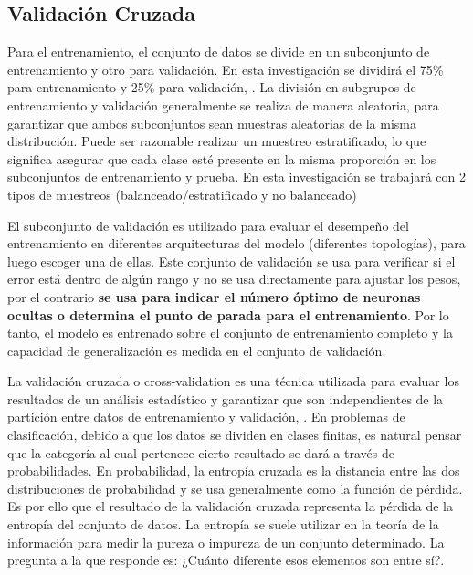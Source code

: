 	\subsection{Validación Cruzada}
	

		Para el entrenamiento, el conjunto de datos se divide en un subconjunto de entrenamiento y otro para validación. En esta investigación se dividirá el 75\% para entrenamiento y 25\% para validación, {\citep {Elkan12evaluatingclassifiers}}. La división en subgrupos de entrenamiento y validación generalmente se realiza de manera aleatoria, para garantizar que ambos subconjuntos sean muestras aleatorias de la misma distribución. Puede ser razonable realizar un muestreo estratificado, lo que significa asegurar que cada clase esté presente en la misma proporción en los subconjuntos de entrenamiento y prueba. En esta investigación se trabajará con 2 tipos de muestreos (balanceado/estratificado y no balanceado)

		El subconjunto de validación es utilizado para evaluar el desempeño del entrenamiento en diferentes arquitecturas del modelo (diferentes topologías), para luego escoger una de ellas. Este conjunto de validación se usa para verificar si el error está dentro de algún rango y no se usa directamente para ajustar los pesos, por el contrario \textbf{se usa para indicar el número óptimo de neuronas ocultas o determina el punto de parada para el entrenamiento}.  Por lo tanto, el modelo es entrenado sobre el conjunto de entrenamiento completo y la capacidad de generalización es medida en el conjunto de validación. 

		La validación cruzada o cross-validation es una técnica utilizada para evaluar los resultados de un análisis estadístico y garantizar que son independientes de la partición entre datos de entrenamiento y validación, \citep{moore2001cross}. En problemas de clasificación, debido a que los datos se dividen en clases finitas, es natural pensar que la categoría al cual pertenece cierto resultado se dará a través de probabilidades. En probabilidad, la entropía cruzada es la distancia entre las dos distribuciones de probabilidad y se usa generalmente como la función de pérdida. Es por ello que el resultado de la validación cruzada representa la pérdida de la entropía del conjunto de datos. La entropía se suele utilizar en la teoría de la información para medir la pureza o impureza de un conjunto determinado. La pregunta a la que responde es: ¿Cuánto diferente esos elementos son entre sí?.  

